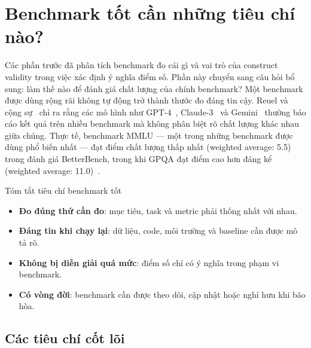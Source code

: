 
\section{Benchmark tốt cần những tiêu chí nào?}
\label{sec:benchmark-quality}

Các phần trước đã phân tích benchmark đo cái gì và vai trò của construct validity trong việc xác định ý nghĩa điểm số. Phần này chuyển sang câu hỏi bổ sung: làm thế nào để đánh giá chất lượng của chính benchmark? Một benchmark được dùng rộng rãi không tự động trở thành thước đo đáng tin cậy. Reuel và cộng sự~\cite{betterbench} chỉ ra rằng các mô hình như GPT-4~\cite{achiam2023gpt4}, Claude-3~\cite{anthropic2024claude3} và Gemini~\cite{team2023gemini} thường báo cáo kết quả trên nhiều benchmark mà không phân biệt rõ chất lượng khác nhau giữa chúng. Thực tế, benchmark MMLU --- một trong những benchmark được dùng phổ biến nhất --- đạt điểm chất lượng thấp nhất (weighted average: 5.5) trong đánh giá BetterBench, trong khi GPQA đạt điểm cao hơn đáng kể (weighted average: 11.0)~\cite{betterbench}.

\begin{summarybox}{Tóm tắt tiêu chí benchmark tốt}
\begin{itemize}
    \item \textbf{Đo đúng thứ cần đo}: mục tiêu, task và metric phải thống nhất với nhau.
    \item \textbf{Đáng tin khi chạy lại}: dữ liệu, code, môi trường và baseline cần được mô tả rõ.
    \item \textbf{Không bị diễn giải quá mức}: điểm số chỉ có ý nghĩa trong phạm vi benchmark.
    \item \textbf{Có vòng đời}: benchmark cần được theo dõi, cập nhật hoặc nghỉ hưu khi bão hòa.
\end{itemize}
\end{summarybox}

\subsection{Các tiêu chí cốt lõi}

